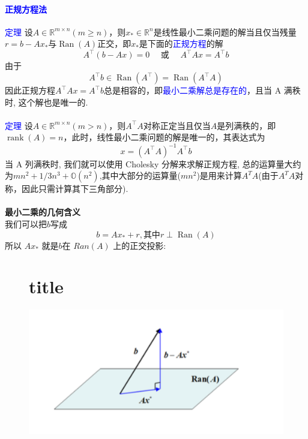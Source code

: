 \documentclass[12pt,a4paper]{article}
\begin{document}
\subsection{\textcolor{blue}{正规方程法}}
\textcolor{blue}{定理} 设$A \in \mathbb{R}^{m \times n}(m \geq n)$，则$x_{*} \in \mathbb{R}^{n}$是线性最小二乘问题的解当且仅当残量$r=b-A x_{*}$与$\operatorname{Ran}(A)$正交，即$x_{*}$是下面的\textcolor{blue}{正规方程}的解
\begin{equation}
A^{\top}(b-A x)=0 \quad \text { 或 } \quad A^{\top} A x=A^{\top} b
\end{equation}
由于
$$
A^{\top} b \in \operatorname{Ran}\left(A^{\top}\right)=\operatorname{Ran}\left(A^{\top} A\right)
$$
因此正规方程$A^{\top} A x=A^{\top} b$总是相容的，即\textcolor{blue}{最小二乘解总是存在的}，且当 A 满秩时, 这个解也是唯一的.\\
\\
\textcolor{blue}{定理} 设$A \in \mathbb{R}^{m \times n}(m>n)$，则$A^{\top} A$对称正定当且仅当$A$是列满秩的，即
$\operatorname{rank}(A)=n$，此时，线性最小二乘问题的解是唯一的，其表达式为
$$
x=\left(A^{\top} A\right)^{-1} A^{\top} b
$$
当 A 列满秩时, 我们就可以使用 Cholesky 分解来求解正规方程, 总的运算量大约为$mn^{2}+1/3n^{3}+\mathbb{O}(n^{2})$,其中大部分的运算量($mn^{2}$)是用来计算$A^{T}A$(由于$A^{T}A$对称，因此只需计算其下三角部分).\\
\\
\textbf{最小二乘的几何含义}\\
我们可以把$b$写成
\begin{equation}
b=A x_{*}+r, \text  {其中} r \perp \operatorname{Ran}(A)
\end{equation}
所以 $Ax_{*}$ 就是$b$在 $Ran(A)$ 上的正交投影:
\begin{figure}[htbp]
\begin{center}
\part{title}\includegraphics[scale=1]{figure2.png}
\label{default}
\end{center}
\end{figure}
\end{document}
